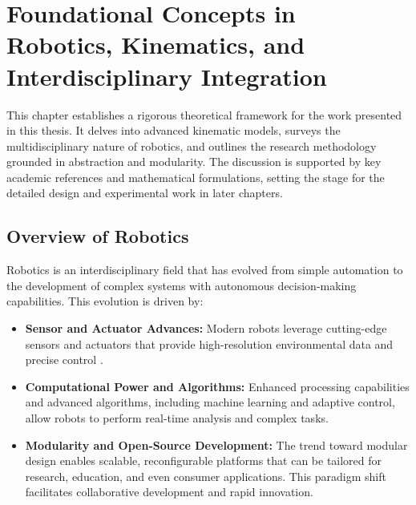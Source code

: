 \chapter{Foundational Concepts in Robotics, Kinematics, and Interdisciplinary Integration}
\label{chap:foundations}

This chapter establishes a rigorous theoretical framework for the work presented in this thesis. It delves into advanced kinematic models, surveys the multidisciplinary nature of robotics, and outlines the research methodology grounded in abstraction and modularity. The discussion is supported by key academic references and mathematical formulations, setting the stage for the detailed design and experimental work in later chapters.

\section{Overview of Robotics}
Robotics is an interdisciplinary field that has evolved from simple automation to the development of complex systems with autonomous decision-making capabilities. This evolution is driven by:
\begin{itemize}
    \item \textbf{Sensor and Actuator Advances:} Modern robots leverage cutting-edge sensors and actuators that provide high-resolution environmental data and precise control \cite{Craig2005,Siciliano2009}.
    \item \textbf{Computational Power and Algorithms:} Enhanced processing capabilities and advanced algorithms, including machine learning and adaptive control, allow robots to perform real-time analysis and complex tasks.
    \item \textbf{Modularity and Open-Source Development:} The trend toward modular design enables scalable, reconfigurable platforms that can be tailored for research, education, and even consumer applications. This paradigm shift facilitates collaborative development and rapid innovation.
\end{itemize}


